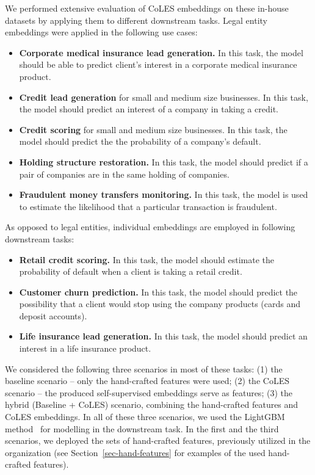 \documentclass[sigconf, anonymous]{acmart}
\begin{document}
We performed extensive evaluation of CoLES embeddings on these in-house datasets by applying
them to different downstream tasks. Legal entity embeddings were applied in the following
use cases:
\begin{itemize}
    \item \textbf{Corporate medical insurance lead generation.}
    In this task, the model should be able to predict client's interest in a corporate medical insurance product.

    \item \textbf{Credit lead generation} for small and medium size businesses.
    In this task, the model should predict an interest of a company in taking a credit.

    \item \textbf{Credit scoring} for small and medium size businesses.
    In this task, the model should predict the the probability of a company's default.

    \item \textbf{Holding structure restoration.}
    In this task, the model should predict if a pair of companies are in the same holding of companies.

    \item \textbf{Fraudulent money transfers monitoring.}
    In this task, the model is used to estimate the likelihood that a particular transaction is fraudulent.
\end{itemize}
%
As opposed to legal entities, individual embeddings are employed in following downstream tasks:
\begin{itemize}
    \item \textbf{Retail credit scoring.}
    In this task, the model should estimate the probability of default when a client is taking a retail credit.

    \item \textbf{Customer churn prediction.}
    In this task, the model should predict the possibility that a client would stop using the company
    products (cards and deposit accounts).

    \item \textbf{Life insurance lead generation.}
    In this task, the model should predict an interest in a life insurance product.
\end{itemize}

We considered the following three scenarios in most of these tasks:
(1) the baseline scenario -- only the hand-crafted features were used;
(2) the CoLES scenario -- the produced self-supervised embeddings serve as features;
(3) the hybrid (Baseline + CoLES) scenario, combining the hand-crafted features and CoLES embeddings.
% 
In all of these three scenarios, we used the LightGBM method~\citep{Ke2017LightGBMAH} for modelling
in the downstream task. In the first and the third scenarios, we deployed the sets of hand-crafted
features, previously utilized in the organization (see Section~\ref{sec-hand-features} for examples
of the used hand-crafted features).
%
\end{document}
